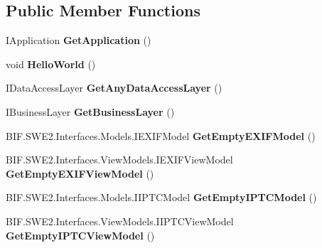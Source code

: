 \subsection*{Public Member Functions}
\begin{DoxyCompactItemize}
\item 
\mbox{\label{class_uebungen_1_1_u_e_b1_a021ee14b3c7f748d0ea8b8f4e8448a23}} 
I\+Application {\bfseries Get\+Application} ()
\item 
\mbox{\label{class_uebungen_1_1_u_e_b1_aab697abf098b3397673486d69da7b9f9}} 
void {\bfseries Hello\+World} ()
\item 
\mbox{\label{class_uebungen_1_1_u_e_b1_a6769645d8b07ca86278ec7a30c602541}} 
I\+Data\+Access\+Layer {\bfseries Get\+Any\+Data\+Access\+Layer} ()
\item 
\mbox{\label{class_uebungen_1_1_u_e_b1_a4bd61282332763ffc9b8782a23668d65}} 
I\+Business\+Layer {\bfseries Get\+Business\+Layer} ()
\item 
\mbox{\label{class_uebungen_1_1_u_e_b1_a5be45bfacf15bb67fd19ebc4054dc5e8}} 
B\+I\+F.\+S\+W\+E2.\+Interfaces.\+Models.\+I\+E\+X\+I\+F\+Model {\bfseries Get\+Empty\+E\+X\+I\+F\+Model} ()
\item 
\mbox{\label{class_uebungen_1_1_u_e_b1_ac382260cb6db86e026753af788b11b75}} 
B\+I\+F.\+S\+W\+E2.\+Interfaces.\+View\+Models.\+I\+E\+X\+I\+F\+View\+Model {\bfseries Get\+Empty\+E\+X\+I\+F\+View\+Model} ()
\item 
\mbox{\label{class_uebungen_1_1_u_e_b1_a324d4ad4b11d6abe83491f00f1739902}} 
B\+I\+F.\+S\+W\+E2.\+Interfaces.\+Models.\+I\+I\+P\+T\+C\+Model {\bfseries Get\+Empty\+I\+P\+T\+C\+Model} ()
\item 
\mbox{\label{class_uebungen_1_1_u_e_b1_a12d4f6edfde2432227252ad34090a8bd}} 
B\+I\+F.\+S\+W\+E2.\+Interfaces.\+View\+Models.\+I\+I\+P\+T\+C\+View\+Model {\bfseries Get\+Empty\+I\+P\+T\+C\+View\+Model} ()
\item 
\mbox{\label{class_uebungen_1_1_u_e_b1_a0f35d334d8da17d34ec6c523d920e31e}} 

\end{DoxyCompactItemize}
